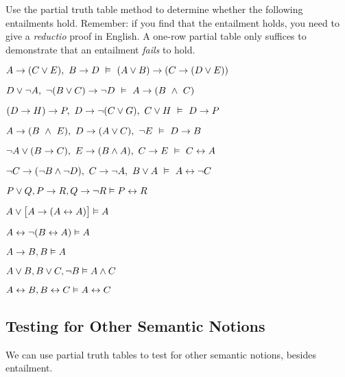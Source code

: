 \practiceproblems
\problempart
Use the partial truth table method to determine whether the following entailments hold.  Remember: if you find that the entailment holds, you need to give a \emph{reductio} proof in English.  A one-row partial table only suffices to demonstrate that an entailment \emph{fails} to hold.
\begin{earg}


\item $A \rightarrow (C \vee E), \ B \rightarrow D \  \vDash \   (A \vee B) \rightarrow (C \rightarrow  (D \vee E))$ %

\item $ D \vee \neg A,\  \neg (B \vee C) \rightarrow \neg D \ \vDash \ A \rightarrow (B \ \wedge  \ C)$ %

\item $(D \rightarrow H) \rightarrow P, \ D \rightarrow \neg (C \vee G), \ C \vee H \ \vDash \ D \rightarrow P$ %


\item $A \rightarrow (B \ \wedge  \ E), \ D \rightarrow (A \vee C), \ \neg E \ \vDash\  D \rightarrow B$ %



\item $\neg A \vee (B\rightarrow C), \ E \rightarrow (B \wedge  A), \ C\rightarrow E \ \vDash \ C \leftrightarrow A$ %

\item $\neg C \rightarrow (\neg B \wedge  \neg D), \  C \rightarrow \neg A, \ B \vee A \ \vDash \ A \leftrightarrow \neg C$ %

\item $P \vee Q, P \rightarrow R, Q\rightarrow \neg R  \vDash  P \leftrightarrow R$ %

\item $A\vee\bigl[A\rightarrow(A\leftrightarrow A)\bigr] \vDash A$ %
\item $A\leftrightarrow\neg(B\leftrightarrow A) \vDash A$ %
\item $A\rightarrow B, B \vDash A$ %
\item $A\vee B, B\vee C, \neg B \vDash A \wedge C$ %
\item $A\leftrightarrow B, B\leftrightarrow C \vDash A\leftrightarrow C$ %

\end{earg}

\subsection{Testing for Other Semantic Notions}




We can use partial truth tables to test for other semantic notions, besides entailment.

